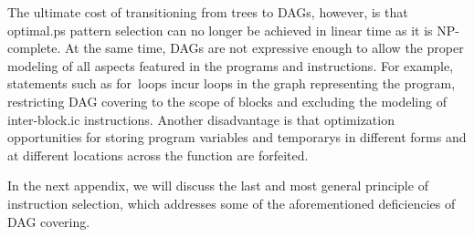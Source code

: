 The ultimate cost of transitioning from \glspl{tree} to \glspl{DAG}, however, is
that \gls{optimal.ps} \gls{pattern selection} can no longer be achieved in
linear time as it is NP-complete.
%
At the same time, \glspl{DAG} are not
expressive enough to allow the proper modeling of all aspects featured in the
\glspl{program} and \glspl{instruction}.
%
For example, statements such as \mbox{for loops} incur \glspl{loop} in the
\gls{graph} representing the \gls{program}, restricting \gls{DAG covering} to
the scope of \glspl{block} and excluding the modeling of \gls{inter-block.ic}
\glspl{instruction}.
%
Another
disadvantage is that optimization opportunities for storing \gls{program}
variables and \glspl{temporary} in different forms and at different locations
across the \gls{function} are forfeited.

In the next appendix, we will discuss the last and most general \gls{principle}
of \gls{instruction selection}, which addresses some of the aforementioned
deficiencies of \gls{DAG covering}.
